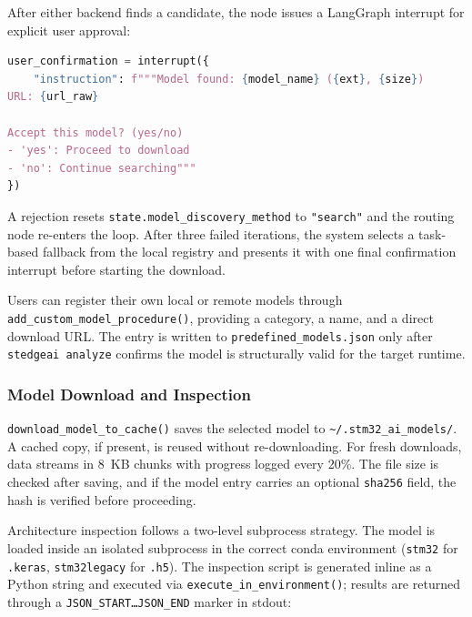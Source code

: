 \begin{description}[leftmargin=0pt, itemsep=10pt]
    After either backend finds a candidate, the node issues a LangGraph interrupt for explicit user approval:

    \begin{lstlisting}[language=python, caption={User confirmation interrupt after each candidate}, label={lst:search_confirm}]
user_confirmation = interrupt({
    "instruction": f"""Model found: {model_name} ({ext}, {size})
URL: {url_raw}

Accept this model? (yes/no)
- 'yes': Proceed to download
- 'no': Continue searching"""
})
    \end{lstlisting}

    A rejection resets \texttt{state.model\_\allowbreak discovery\_\allowbreak method} to \texttt{"search"} and the routing node re-enters the loop. After three failed iterations, the system selects a task-based fallback from the local registry and presents it with one final confirmation interrupt before starting the download.

    \item[\textbf{Tier 3 - User Model Registration.}]
    Users can register their own local or remote models through \texttt{add\_\allowbreak custom\_\allowbreak model\_\allowbreak procedure()}, providing a category, a name, and a direct download URL. The entry is written to \texttt{predefined\_models.json} only after \texttt{stedgeai analyze} confirms the model is structurally valid for the target runtime.

\end{description}

\subsubsection{Model Download and Inspection}

\texttt{download\_\allowbreak model\_\allowbreak to\_\allowbreak cache()} saves the selected model to \texttt{\textasciitilde/.stm32\_\allowbreak ai\_\allowbreak models/}. A cached copy, if present, is reused without re-downloading. For fresh downloads, data streams in 8~KB chunks with progress logged every 20\%. The file size is checked after saving, and if the model entry carries an optional \texttt{sha256} field, the hash is verified before proceeding.

Architecture inspection follows a two-level subprocess strategy. The model is loaded inside an isolated subprocess in the correct conda environment (\texttt{stm32} for \texttt{.keras}, \texttt{stm32legacy} for \texttt{.h5}). The inspection script is generated inline as a Python string and executed via \texttt{execute\_\allowbreak in\_\allowbreak environment()}; results are returned through a \texttt{JSON\_\allowbreak START\ldots JSON\_\allowbreak END} marker in stdout:

